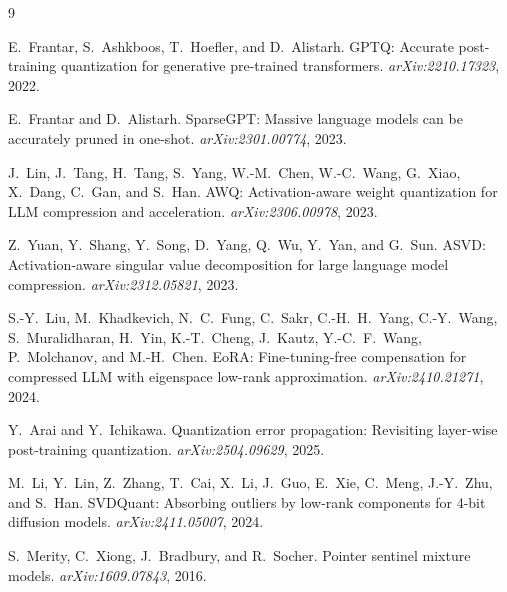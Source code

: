 \documentclass[11pt]{article}
\begin{document}
\begin{thebibliography}{9}

E.~Frantar, S.~Ashkboos, T.~Hoefler, and D.~Alistarh.
GPTQ: Accurate post-training quantization for generative pre-trained
transformers.
\emph{arXiv:2210.17323}, 2022.

E.~Frantar and D.~Alistarh.
SparseGPT: Massive language models can be accurately pruned in one-shot.
\emph{arXiv:2301.00774}, 2023.

J.~Lin, J.~Tang, H.~Tang, S.~Yang, W.-M.~Chen, W.-C.~Wang, G.~Xiao,
X.~Dang, C.~Gan, and S.~Han.
AWQ: Activation-aware weight quantization for LLM compression and
acceleration.
\emph{arXiv:2306.00978}, 2023.

Z.~Yuan, Y.~Shang, Y.~Song, D.~Yang, Q.~Wu, Y.~Yan, and G.~Sun.
ASVD: Activation-aware singular value decomposition for large language
model compression.
\emph{arXiv:2312.05821}, 2023.

S.-Y.~Liu, M.~Khadkevich, N.~C.~Fung, C.~Sakr, C.-H.~H.~Yang, C.-Y.~Wang,
S.~Muralidharan, H.~Yin, K.-T.~Cheng, J.~Kautz, Y.-C.~F.~Wang,
P.~Molchanov, and M.-H.~Chen.
EoRA: Fine-tuning-free compensation for compressed LLM with eigenspace
low-rank approximation.
\emph{arXiv:2410.21271}, 2024.

Y.~Arai and Y.~Ichikawa.
Quantization error propagation: Revisiting layer-wise post-training
quantization.
\emph{arXiv:2504.09629}, 2025.

M.~Li, Y.~Lin, Z.~Zhang, T.~Cai, X.~Li, J.~Guo, E.~Xie, C.~Meng,
J.-Y.~Zhu, and S.~Han.
SVDQuant: Absorbing outliers by low-rank components for 4-bit diffusion
models.
\emph{arXiv:2411.05007}, 2024.

S.~Merity, C.~Xiong, J.~Bradbury, and R.~Socher.
Pointer sentinel mixture models.
\emph{arXiv:1609.07843}, 2016.

\end{thebibliography}
\end{document}
